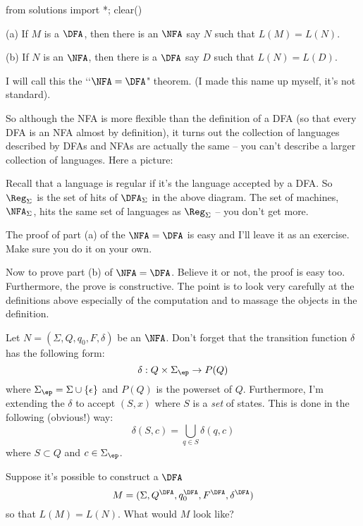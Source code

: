 \begin{python0}
from solutions import *; clear()
\end{python0}

\begin{thm} \mbox{}
 \begin{tightlist}
 \item[(a)] If $M$ is a $\DFA$, then there is an $\NFA$ say $N$ such
  that $L(M) = L(N)$.
 \item[(b)] If $N$ is an $\NFA$, then there is a $\DFA$ say $D$ such
 that $L(N) = L(D)$.
 \end{tightlist}
\end{thm}

I will call this the \lq\lq $\NFA = \DFA$" theorem. (I made this name up
myself, it's not standard).

So although the NFA is more flexible than the definition of a DFA
(so that every DFA is an NFA almost by definition),
it turns out the collection of languages described by DFAs and NFAs
are actually the same -- you can't describe a larger collection of languages.
Here a picture:



Recall that a language is regular if it's the language
accepted by a DFA.
So $\Reg_\Sigma$ is the set of hits of $\DFA_\Sigma$ in the above diagram.
The set of machines, $\NFA_\Sigma$, hits
the same set of languages as $\Reg_\Sigma$ -- you don't get more.

The proof of part (a) of the $\NFA=\DFA$ is easy and I'll leave it as an
exercise. Make sure you do it on your own.

Now to prove part (b) of $\NFA=\DFA$. Believe it or not, the proof is
easy too. Furthermore, the prove is constructive. The point is to
look very carefully at the definitions above especially of the
computation and to massage the objects in the definition.

Let $N = (\Sigma,Q,q_0,F,\delta)$ be an $\NFA$. 
Don't forget that the transition function $\delta$ has the following form:
\[
\delta: Q \times \Sigma_\ep \rightarrow P(Q)
\] 
where $\Sigma_\ep = \Sigma \cup \{\epsilon\}$ and $P(Q)$ is the 
powerset of $Q$.
Furthermore, I'm extending the $\delta$ to accept $(S, x)$
where $S$ is a \textit{set} of states.
This is done in the following (obvious!) way:
\[
\delta(S, c) = \bigcup_{q \in S} \delta(q, c)
\]
where $S \subset Q$ and $c \in \Sigma_\ep$.

Suppose it's possible
to construct a $\DFA$ 
\[
M = (\Sigma,Q^{\DFA}, q_0^{\DFA}, F^{\DFA}, \delta^{\DFA})
\]
so that $L(M) = L(N)$. What would $M$ look like?


